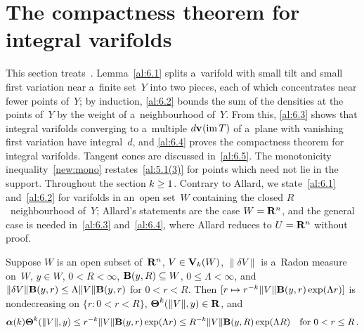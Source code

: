 %
\providecommand{\affgrass}[2]{\mathbf{A}(#1,#2)}   %

\section{The compactness theorem for integral varifolds}
\label{sec:compactness}

\begin{miniremark}
    \label{mr:sec6}
    This section treats~\cite[section~6]{Allard1972}. Lemma~\ref{al:6.1} splits a~varifold with
    small tilt and small first variation near a~finite set~$Y$ into two pieces, each of which
    concentrates near fewer points of~$Y$; by induction, \ref{al:6.2} bounds the sum of the
    densities at the points of~$Y$ by the weight of a~neighbourhood of~$Y$. From this,
    \ref{al:6.3} shows that integral varifolds converging to a~multiple $d \mathbf{v}_{}(\operatorname{im} T)$ of a~plane
    with vanishing first variation have integral~$d$, and \ref{al:6.4} proves the compactness
    theorem for integral varifolds. Tangent cones are discussed in~\ref{al:6.5}. The monotonicity
    inequality~\ref{new:mono} restates~\ref{al:5.1(3)} for points which need not lie in the
    support. Throughout the section $k \ge 1$. Contrary to Allard, we state~\ref{al:6.1}
    and~\ref{al:6.2} for varifolds in an~open set~$W$ containing the closed $R$~neighbourhood
    of~$Y$; Allard's statements are the case $W = \mathbf{R}^{n}$, and the general case is needed
    in~\ref{al:6.3} and~\ref{al:6.4}, where Allard reduces to $U = \mathbf{R}^{n}$ without proof.
\end{miniremark}

\begin{lemma}[new]
    \label{new:mono}
    Suppose $W$ is an open subset of~$\mathbf{R}^{n}$, $V \in \mathbf{V}_{k}(W)$, $\|\delta V\|$ is
    a~Radon measure on~$W$, $y \in W$, $0 < R < \infty$, $\mathbf{B}(y,R) \subseteq W$, $0 \le
    \Lambda < \infty$, and $\|\delta V\| \mathbf{B}(y,r) \le \Lambda \|V\| \mathbf{B}(y,r)$ for $0 < r
    < R$. Then $[r \mapsto r^{-k} \|V\| \mathbf{B}(y,r) \exp(\Lambda r)]$ is nondecreasing on
    $\{ r : 0 < r < R \}$, $\boldsymbol{\Theta}^{k}(\|V\|,y) \in \mathbf{R}$, and
    \begin{displaymath}
        \boldsymbol{\alpha}(k) \boldsymbol{\Theta}^{k}(\|V\|,y) \le r^{-k} \|V\| \mathbf{B}(y,r)
        \exp(\Lambda r) \le R^{-k} \|V\| \mathbf{B}(y,R) \exp(\Lambda R) \quad \text{for $0 < r
        \le R$} \,.
    \end{displaymath}
\end{lemma}

